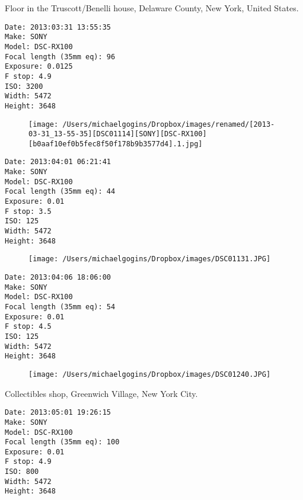 \documentclass[11pt,letter,DIV=14,paper=landscape]{scrbook}
\begin{document}
\clearpage
\noindent Floor in the Truscott/Benelli house, Delaware County, New York, United States.
\noindent
\begin{lstlisting}
Date: 2013:03:31 13:55:35
Make: SONY
Model: DSC-RX100
Focal length (35mm eq): 96
Exposure: 0.0125
F stop: 4.9
ISO: 3200
Width: 5472
Height: 3648
\end{lstlisting}
\clearpage

\begin{figure}
\texttt{[image: /Users/michaelgogins/Dropbox/images/renamed/[2013-03-31\_13-55-35][DSC01114][SONY][DSC-RX100][b0aaf10ef0b5fec8f50f178b9b3577d4].1.jpg]}
\end{figure}
    
\clearpage
\noindent 
\noindent
\begin{lstlisting}
Date: 2013:04:01 06:21:41
Make: SONY
Model: DSC-RX100
Focal length (35mm eq): 44
Exposure: 0.01
F stop: 3.5
ISO: 125
Width: 5472
Height: 3648
\end{lstlisting}
\clearpage

\begin{figure}
\texttt{[image: /Users/michaelgogins/Dropbox/images/DSC01131.JPG]}
\end{figure}
    
\clearpage
\noindent 
\noindent
\begin{lstlisting}
Date: 2013:04:06 18:06:00
Make: SONY
Model: DSC-RX100
Focal length (35mm eq): 54
Exposure: 0.01
F stop: 4.5
ISO: 125
Width: 5472
Height: 3648
\end{lstlisting}
\clearpage

\begin{figure}
\texttt{[image: /Users/michaelgogins/Dropbox/images/DSC01240.JPG]}
\end{figure}
    
\clearpage
\noindent Collectibles shop, Greenwich Village, New York City.
\noindent
\begin{lstlisting}
Date: 2013:05:01 19:26:15
Make: SONY
Model: DSC-RX100
Focal length (35mm eq): 100
Exposure: 0.01
F stop: 4.9
ISO: 800
Width: 5472
Height: 3648
\end{lstlisting}
\clearpage
\end{document}
